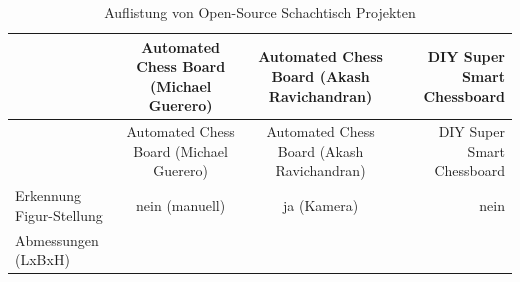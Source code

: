 \begin{longtable}[]{@{}lccr@{}}
\caption{Auflistung von Open-Source Schachtisch Projekten
\label{oschesstables}}\tabularnewline
\toprule
\begin{minipage}[b]{0.19\columnwidth}\raggedright
\strut
\end{minipage} & \begin{minipage}[b]{0.25\columnwidth}\centering
Automated Chess Board (Michael Guerero)\strut
\end{minipage} & \begin{minipage}[b]{0.26\columnwidth}\centering
Automated Chess Board (Akash Ravichandran)\strut
\end{minipage} & \begin{minipage}[b]{0.19\columnwidth}\raggedleft
DIY Super Smart Chessboard\strut
\end{minipage}\tabularnewline
\midrule
\endfirsthead
\toprule
\begin{minipage}[b]{0.19\columnwidth}\raggedright
\strut
\end{minipage} & \begin{minipage}[b]{0.25\columnwidth}\centering
Automated Chess Board (Michael Guerero)\strut
\end{minipage} & \begin{minipage}[b]{0.26\columnwidth}\centering
Automated Chess Board (Akash Ravichandran)\strut
\end{minipage} & \begin{minipage}[b]{0.19\columnwidth}\raggedleft
DIY Super Smart Chessboard\strut
\end{minipage}\tabularnewline
\midrule
\endhead
\begin{minipage}[t]{0.19\columnwidth}\raggedright
Erkennung Figur-Stellung\strut
\end{minipage} & \begin{minipage}[t]{0.25\columnwidth}\centering
nein (manuell)\strut
\end{minipage} & \begin{minipage}[t]{0.26\columnwidth}\centering
ja (Kamera)\strut
\end{minipage} & \begin{minipage}[t]{0.19\columnwidth}\raggedleft
nein\strut
\end{minipage}\tabularnewline
\begin{minipage}[t]{0.19\columnwidth}\raggedright
Abmessungen (LxBxH)\strut
\end{minipage} & \begin{minipage}[t]{0.25\columnwidth}\centering

\end{minipage}
\end{longtable}
